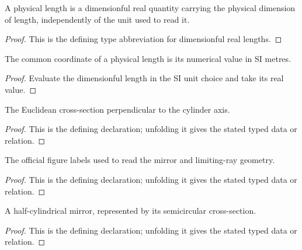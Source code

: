 \begin{definition}[PhysicalLength]
  \label{decl:physics:IPhO_2026_2_A_1:PhysicalLength}
  A physical length is a dimensionful real quantity carrying the physical
  dimension of length, independently of the unit used to read it.
\end{definition}
\begin{proof}
  This is the defining type abbreviation for dimensionful real lengths.
\end{proof}

\begin{definition}[lengthCoordinate]
  \label{decl:physics:IPhO_2026_2_A_1:lengthCoordinate}
  The common coordinate of a physical length is its numerical value in SI
  metres.
\end{definition}
\begin{proof}
  Evaluate the dimensionful length in the SI unit choice and take its real
  value.
\end{proof}

\begin{definition}[CrossSectionPoint]
  \label{decl:physics:IPhO_2026_2_A_1:CrossSectionPoint}
  The Euclidean cross-section perpendicular to the cylinder axis.
\end{definition}
\begin{proof}
  This is the defining declaration; unfolding it gives the stated typed data or relation.
\end{proof}

\begin{definition}[FigureLabel]
  \label{decl:physics:IPhO_2026_2_A_1:FigureLabel}
  The official figure labels used to read the mirror and limiting-ray geometry.
\end{definition}
\begin{proof}
  This is the defining declaration; unfolding it gives the stated typed data or relation.
\end{proof}

\begin{definition}[HalfCylindricalMirror]
  \label{decl:physics:IPhO_2026_2_A_1:HalfCylindricalMirror}
  A half-cylindrical mirror, represented by its semicircular cross-section.
\end{definition}
\begin{proof}
  This is the defining declaration; unfolding it gives the stated typed data or relation.
\end{proof}


